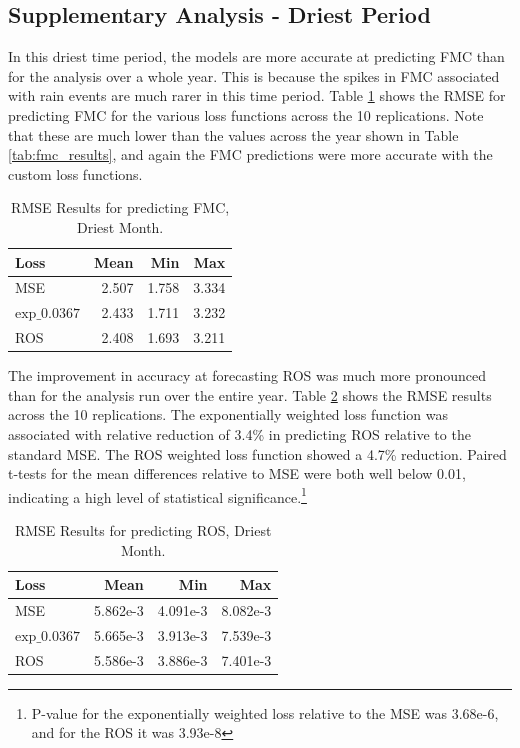 \documentclass[11pt]{article}%
\begin{document}
\subsection{Supplementary Analysis - Driest Period}

In this driest time period, the models are more accurate at predicting FMC than for the analysis over a whole year. This is because the spikes in FMC associated with rain events are much rarer in this time period. Table \ref{tab:fmc_results_dry} shows the RMSE for predicting FMC for the various loss functions across the 10 replications. Note that these are much lower than the values across the year shown in Table \ref{tab:fmc_results}, and again the FMC predictions were more accurate with the custom loss functions.

\begin{table}[ht]
\centering
\caption{RMSE Results for predicting FMC, Driest Month.}
\label{tab:fmc_results_dry}
\begin{tabular}{lrrr}
\toprule
Loss & Mean & Min & Max \\
\midrule
MSE & 2.507 & 1.758 & 3.334 \\
$\text{exp}\_0.0367$ & 2.433 & 1.711 & 3.232 \\
ROS & 2.408 & 1.693 & 3.211 \\
\bottomrule
\end{tabular}
\end{table}


The improvement in accuracy at forecasting ROS was much more pronounced than for the analysis run over the entire year. Table \ref{tab:ros_results_dry} shows the RMSE results across the 10 replications. The exponentially weighted loss function was associated with relative reduction of 3.4\% in predicting ROS relative to the standard MSE. The ROS weighted loss function showed a 4.7\% reduction. Paired t-tests for the mean differences relative to MSE were both well below 0.01, indicating a high level of statistical significance.\footnote{P-value for the exponentially weighted loss relative to the MSE was 3.68e-6, and for the ROS it was 3.93e-8} 

\begin{table}[ht]
\centering
\caption{RMSE Results for predicting ROS, Driest Month.}
\label{tab:ros_results_dry}
\begin{tabular}{lrrr}
\toprule
Loss & Mean & Min & Max \\
\midrule
MSE & 5.862e-3 & 4.091e-3 & 8.082e-3 \\
$\text{exp}\_0.0367$ & 5.665e-3 & 3.913e-3 & 7.539e-3 \\
ROS & 5.586e-3 & 3.886e-3 & 7.401e-3 \\
\bottomrule
\end{tabular}
\end{table}
\end{document}
